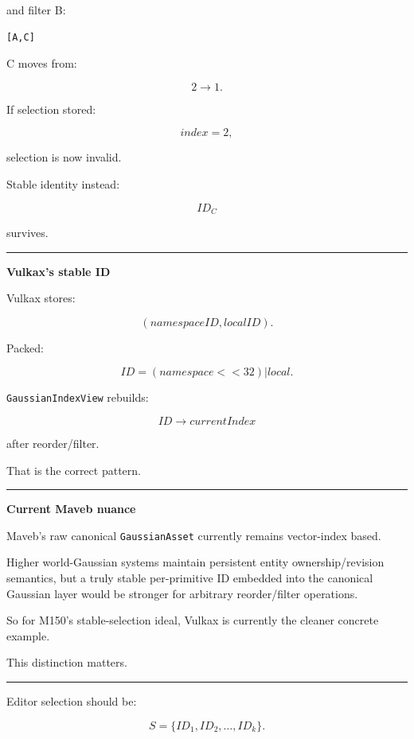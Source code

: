 and filter B:

\protect{}\label{f1gg6w}%
\begin{verbatim}
[A,C]
\end{verbatim}

C moves from:

\[
2\rightarrow1.
\]

If selection stored:

\[
index=2,
\]

selection is now invalid.

Stable identity instead:

\[
ID_C
\]

survives.

\begin{center}\rule{0.5\linewidth}{0.5pt}\end{center}

\textbf{Vulkax's stable ID}

Vulkax stores:

\[
(namespaceID,localID).
\]

Packed:

\[
\boxed{
ID=
(namespace<<32)
|
local.
}
\]

\texttt{GaussianIndexView} rebuilds:

\[
ID\rightarrow currentIndex
\]

after reorder/filter.

That is the correct pattern.

\begin{center}\rule{0.5\linewidth}{0.5pt}\end{center}

\textbf{Current Maveb nuance}

Maveb's raw canonical \texttt{GaussianAsset} currently remains vector-index based.

Higher world-Gaussian systems maintain persistent entity ownership/revision semantics, but a truly stable per-primitive ID embedded into the canonical Gaussian layer would be stronger for arbitrary reorder/filter operations.

So for M150's stable-selection ideal, Vulkax is currently the cleaner concrete example.

This distinction matters.

\begin{center}\rule{0.5\linewidth}{0.5pt}\end{center}

Editor selection should be:

\[
\boxed{
S=
\{ID_1,ID_2,\dots,ID_k\}.
}
\]

